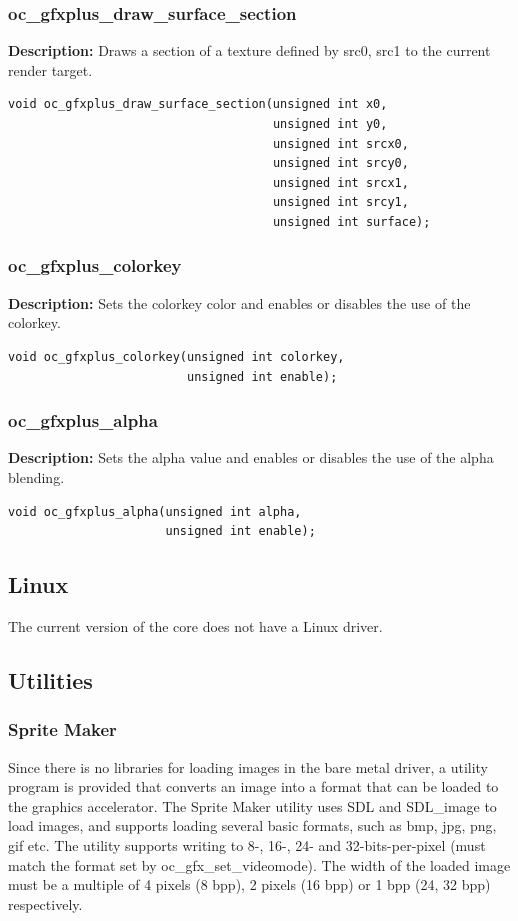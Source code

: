 \documentclass[10pt,a4paper]{article}
\begin{document}
\subsubsection{oc\_gfxplus\_draw\_surface\_section}
\textbf{Description:} Draws a section of a texture defined by src0, src1 to the current render target.
\begin{lstlisting}
void oc_gfxplus_draw_surface_section(unsigned int x0,
                                     unsigned int y0,
                                     unsigned int srcx0,
                                     unsigned int srcy0,
                                     unsigned int srcx1,
                                     unsigned int srcy1,
                                     unsigned int surface);
\end{lstlisting}


\subsubsection{oc\_gfxplus\_colorkey}
\textbf{Description:} Sets the colorkey color and enables or disables the use of the colorkey.
\begin{lstlisting}
void oc_gfxplus_colorkey(unsigned int colorkey, 
                         unsigned int enable);
\end{lstlisting}

\subsubsection{oc\_gfxplus\_alpha}
\textbf{Description:} Sets the alpha value and enables or disables the use of the alpha blending.
\begin{lstlisting}
void oc_gfxplus_alpha(unsigned int alpha, 
                      unsigned int enable);
\end{lstlisting}

\subsection{Linux}
The current version of the core does not have a Linux driver.

\subsection{Utilities}
\subsubsection{Sprite Maker}
Since there is no libraries for loading images in the bare metal driver, a utility program is provided that converts an image into a format that can be loaded to the graphics accelerator. The Sprite Maker utility uses SDL and SDL\_image to load images, and supports loading several basic formats, such as bmp, jpg, png, gif etc. The utility supports writing to 8-, 16-, 24- and 32-bits-per-pixel (must match the format set by oc\_gfx\_set\_videomode). The width of the loaded image must be a multiple of 4 pixels (8 bpp), 2 pixels (16 bpp) or 1 bpp (24, 32 bpp) respectively.
\end{document}
